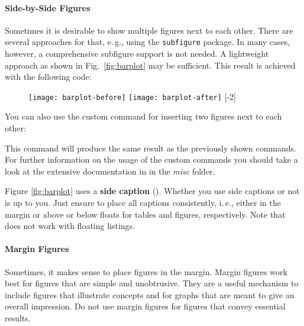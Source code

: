 \paragraph{Side-by-Side Figures} Sometimes it is desirable to show multiple figures next to each other. There are several approaches for that, e.\,g., using the \texttt{subfigure} package. In many cases, however, a comprehensive subfigure support is not needed. A lightweight approach as shown in Fig.~\ref{fig:barplot} may be sufficient. This result is achieved with the following code:
\begin{latex}
\begin{figure}[t]
\centering
\texttt{[image: barplot-before]}%
\hspace{\fill}%
\texttt{[image: barplot-after]}
[-2\baselineskip]
\end{figure}
\end{latex}

You can also use the custom command  for inserting two figures next to each other:

\begin{latex}
\end{latex}

This command will produce the same result as the previously shown commands.
For further information on the usage of the custom commands you should take a look at the extensive documentation in  in the \emph{misc} folder.


Figure \ref{fig:barplot} uses a \textbf{side caption} (). Whether you use side captions or not is up to you.
Just ensure to place all captions consistently, i.\,e., either in the margin or above or below floats for tables and figures, respectively. Note that  does not work with floating listings.

\paragraph{Margin Figures} Sometimes, it makes sense to place figures in the margin. Margin figures work best for figures that are simple and unobtrusive. They are a useful mechanism to include figures that illustrate concepts and for graphs that are meant to give an overall impression. Do not use margin figures for figures that convey essential results.


